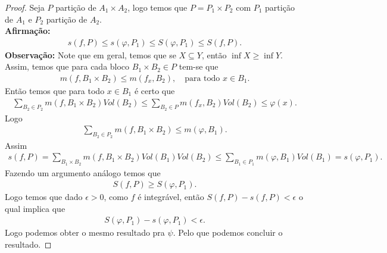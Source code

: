 \begin{proof} 
  Seja $P$ partição de $A_1\times A_2$, logo temos que $P=P_1\times P_2$ com $P_1$ partição de $A_1$ e $P_2$ partição de $A_2$.\\
  \textbf{Afirmação:}
  \begin{align*}
    s(f,P)\leq s(\varphi,P_1)\leq S(\varphi,P_1)\leq S(f,P).
  \end{align*}
  \textbf{Observação:} Note que em geral, temos que se $X\subseteq Y$, então $\inf X \geq \inf Y$.\\
  Assim, temos que para cada bloco $B_1\times B_2\in P$ tem-se que
  \begin{align*}
    m(f,B_1\times B_2)\leq m(f_x,B_2),\quad\text{para todo }x\in B_1.
  \end{align*}
  Então temos que para todo $x\in B_1$ é certo que 
  \begin{align*}
    \sum_{B_2\in P_2}m(f,B_1\times B_2)Vol(B_2)\leq \sum_{B_2\in P}m(f_x,B_2)Vol(B_2)\leq \varphi(x).
  \end{align*}
  Logo
  \begin{align*}
    \sum_{B_2\in P_2}m(f,B_1\times B_2)\leq m(\varphi,B_1).
  \end{align*}
  Assim
  \begin{align*}
    s(f,P)=\sum_{B_1\times B_2}m(f,B_1\times B_2)Vol(B_1)Vol(B_2)\leq \sum_{B_1\in P_1}m(\varphi,B_1)Vol(B_1)=s(\varphi,P_1).
  \end{align*}
  Fazendo um argumento análogo temos que
  \begin{align*}
    S(f,P)\geq S(\varphi,P_1).
  \end{align*}
  Logo temos que dado $\epsilon>0$, como $f$ é integrável, então $S(f,P)-s(f,P)<\epsilon$ o qual implica que
  \begin{align*}
    S(\varphi,P_1)-s(\varphi,P_1)<\epsilon.
  \end{align*}
  Logo podemos obter o mesmo resultado pra $\psi$. Pelo que podemos concluir o resultado. 
\end{proof}

